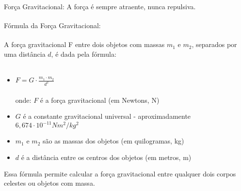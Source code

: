 \documentclass[a4paper,14pt]{article}
\begin{document}
	Força Gravitacional: A força é sempre atraente, nunca repulsiva. \\\\
	Fórmula da Força Gravitacional: \\\\
	A força gravitacional F entre dois objetos com massas $m_1$ e $m_2$, separados por uma distância 
	$d$, é dada pela fórmula: \\\\
	\begin{itemize}
	\item $F = G \cdot \frac{m_1 \cdot m_2}{d^2}$ \\\\
	onde: $F$ é a força gravitacional (em Newtons, N)
	\item $G$ é a constante gravitacional universal - aproximadamente $6,674 \cdot 10^{-11} Nm^2 / kg^2$
	\item $m_1$ e $m_2$ são as massas dos objetos (em quilogramas, kg)
	\item $d$ é a distância entre os centros dos objetos (em metros, m)
	\end{itemize}
	Essa fórmula permite calcular a força gravitacional entre qualquer dois corpos celestes ou objetos com massa.\\\\
\end{document}
